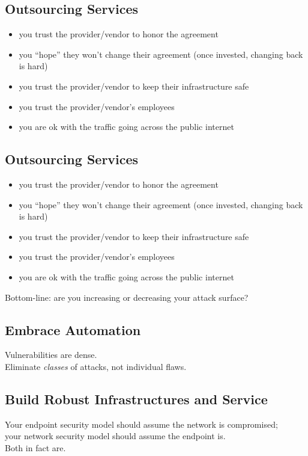 \documentclass[xga]{xdvislides}
\begin{document}
\subsection{Outsourcing Services}
\begin{itemize}
	\item you trust the provider/vendor to honor the agreement
	\item you ``hope'' they won't change their agreement (once
		invested, changing back is hard)
	\item you trust the provider/vendor to keep their infrastructure
		safe
	\item you trust the provider/vendor's employees
	\item you are ok with the traffic going across the public internet
\end{itemize}

\subsection{Outsourcing Services}
\begin{itemize}
	\item you trust the provider/vendor to honor the agreement
	\item you ``hope'' they won't change their agreement (once
		invested, changing back is hard)
	\item you trust the provider/vendor to keep their infrastructure
		safe
	\item you trust the provider/vendor's employees
	\item you are ok with the traffic going across the public internet
\end{itemize}
\addvspace{.5in}
Bottom-line: are you increasing or decreasing your
attack surface?

\subsection{Embrace Automation}
\vspace*{\fill}
\Huge
\begin{center}
	Vulnerabilities are dense. \\
\addvspace{.5in}
	Eliminate {\em classes} of attacks, not
	individual flaws. \\
\end{center}
\Normalsize
\vspace*{\fill}

\subsection{Build Robust Infrastructures and Service}
\vspace*{\fill}
\Huge
\begin{center}
	Your endpoint security model should assume the
	network is compromised; \\
	your network security model should assume the
	endpoint is. \\
\addvspace{.5in}
	Both in fact are.
\end{center}
\Normalsize
\vspace*{\fill}
\end{document}
